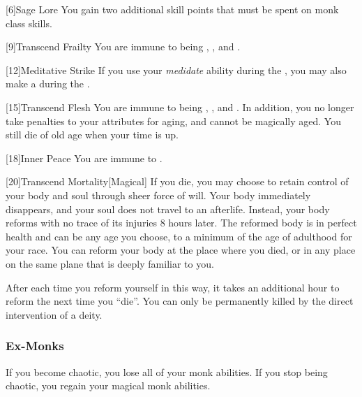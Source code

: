            [6]{Sage Lore} You gain two additional skill points that must be spent on monk class skills.

            [9]{Transcend Frailty}
            You are immune to being , , and .

            [12]{Meditative Strike} If you use your \textit{medidate} ability during the , you may also make a  during the .

            [15]{Transcend Flesh}
            You are immune to being , , and .
            In addition, you no longer take penalties to your attributes for aging, and cannot be magically aged.
            You still die of old age when your time is up.

            [18]{Inner Peace}
            You are immune to  .

            [20]{Transcend Mortality}[Magical]
            If you die, you may choose to retain control of your body and soul through sheer force of will.
            Your body immediately disappears, and your soul does not travel to an afterlife.
            Instead, your body reforms with no trace of its injuries 8 hours later.
            The reformed body is in perfect health and can be any age you choose, to a minimum of the age of adulthood for your race.
            You can reform your body at the place where you died, or in any place on the same plane that is deeply familiar to you.

            After each time you reform yourself in this way, it takes an additional hour to reform the next time you ``die''.
            You can only be permanently killed by the direct intervention of a deity.

        \subsubsection{Ex-Monks}
            If you become chaotic, you lose all of your  monk abilities.
            If you stop being chaotic, you regain your magical monk abilities.


